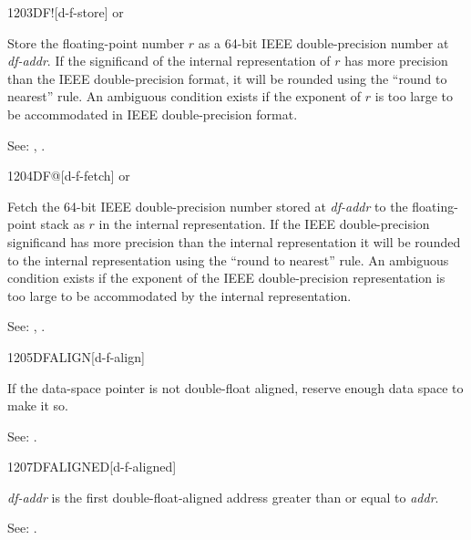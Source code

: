 \begin{newword}{1203}{DF!}[d-f-store]
	  or

	Store the floating-point number $r$ as a 64-bit IEEE
	double-precision number at \emph{df-addr}. If the significand
	of the internal representation of $r$ has more precision than
	the IEEE double-precision format, it will be rounded using the
	``round to nearest'' rule. An ambiguous condition exists if the
	exponent of $r$ is too large to be accommodated in IEEE
	double-precision format.

\item[See:]
	,
	.
\end{newword}


\begin{newword}{1204}{DF@}[d-f-fetch]
	  or

	Fetch the 64-bit IEEE double-precision number stored at
	\emph{df-addr} to the floating-point stack as $r$ in the
	internal representation. If the IEEE double-precision
	significand has more precision than the internal representation
	it will be rounded to the internal representation using the
	``round to nearest'' rule. An ambiguous condition exists if the
	exponent of the IEEE double-precision representation is too
	large to be accommodated by the internal representation.

\item[See:]
	,
	.
\end{newword}


\begin{newword}{1205}{DFALIGN}[d-f-align]
	\stack{}{}

	If the data-space pointer is not double-float aligned, reserve
	enough data space to make it so.

\item[See:]
	.
\end{newword}


\begin{newword}{1207}{DFALIGNED}[d-f-aligned]

	\emph{df-addr} is the first double-float-aligned address greater
	than or equal to \emph{addr}.

\item[See:]
	.
\end{newword}


